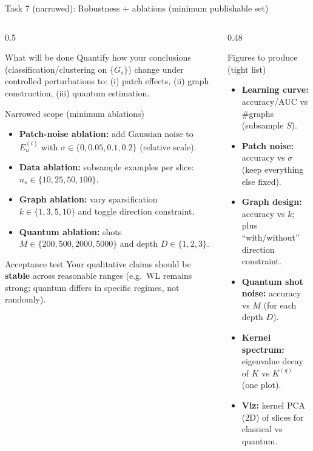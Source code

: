 \documentclass[aspectratio=169,xcolor={dvipsnames}]{beamer}
\renewcommand{\accent}[1]{\textbf{#1}}
\begin{document}
\begin{frame}[shrink=38]{Task 7 (narrowed): Robustness + ablations (minimum publishable set)}
\small
\begin{columns}[T,onlytextwidth]

\begin{column}{0.5\textwidth}
\begin{block}{What will be done}
Quantify how your conclusions (classification/clustering on $\{G_s\}$) change under
controlled perturbations to: (i) patch effects, (ii) graph construction, (iii) quantum estimation.
\end{block}

\begin{block}{Narrowed scope (minimum ablations)}
\begin{itemize}\setlength\itemsep{3pt}
\item \accent{Patch-noise ablation:} add Gaussian noise to $E_u^{(i)}$ with $\sigma\in\{0,0.05,0.1,0.2\}$ (relative scale).
\item \accent{Data ablation:} subsample examples per slice: $n_s\in\{10,25,50,100\}$.
\item \accent{Graph ablation:} vary sparsification $k\in\{1,3,5,10\}$ and toggle direction constraint.
\item \accent{Quantum ablation:} shots $M\in\{200,500,2000,5000\}$ and depth $D\in\{1,2,3\}$.
\end{itemize}
\end{block}

\begin{block}{Acceptance test}
Your qualitative claims should be \accent{stable} across reasonable ranges
(e.g.\ WL remains strong; quantum differs in specific regimes, not randomly).
\end{block}
\end{column}

\begin{column}{0.48\textwidth}
\begin{block}{Figures to produce (tight list)}
\begin{itemize}\setlength\itemsep{4pt}
\item \accent{Learning curve:} accuracy/AUC vs \#graphs (subsample $S$).
\item \accent{Patch noise:} accuracy vs $\sigma$ (keep everything else fixed).
\item \accent{Graph design:} accuracy vs $k$; plus “with/without” direction constraint.
\item \accent{Quantum shot noise:} accuracy vs $M$ (for each depth $D$).
\item \accent{Kernel spectrum:} eigenvalue decay of $K$ vs $K^{(q)}$ (one plot).
\item \accent{Viz:} kernel PCA (2D) of slices for classical vs quantum.
\end{itemize}
\end{block}


\end{column}
\end{columns}
\end{frame}
\end{document}
